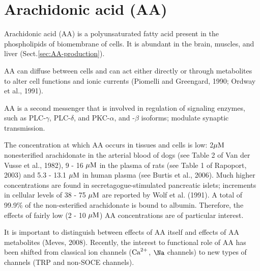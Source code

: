 \section{Arachidonic acid (AA)}
\label{sec:arachidonic-acids}

Arachidonic acid (AA) is a polyunsaturated fatty acid present in the
phospholipids of biomembrane of cells. It is abundant in the brain, muscles, and
liver (Sect.\ref{sec:AA-production}).

AA can diffuse between cells and can act either directly or through metabolites
to alter cell functions and ionic currents (Piomelli and Greengard, 1990; Ordway
et al., 1991).

AA is a second messenger that is involved in regulation of signaling enzymes,
such as PLC-$\gamma$, PLC-$\delta$, and PKC-$\alpha$, and -$\beta$
isoforms; modulate synaptic transmission. 

The concentration at which AA occurs in tissues and cells is low: 2${\mu\text{M}}$
nonesterified arachidonate in the arterial blood of dogs (see Table 2 of Van der
Vusse et al., 1982), 9 - 16 ${\mu\text{M}}$ in the plasma of rats (see Table 1 of Rapoport,
2003) and 5.3 - 13.1 ${\mu\text{M}}$ in human plasma (see Burtis et al., 2006).
Much higher concentrations are found in secretagogue-stimulated pancreatic
islets; increments in cellular levels of 38 - 75 ${\mu\text{M}}$ are reported by Wolf et
al. (1991). A total of 99.9\% of the non-esterified arachidonate is bound to
albumin. Therefore, the effects of fairly low (2 - 10 ${\mu\text{M}}$) AA concentrations are of
particular interest.

It is important to distinguish between effects of AA itself and effects of AA
metabolites (Meves, 2008). Recently, the interest to functional role of AA has
been shifted from classical ion channels (${\text{Ca}^{2+}}$, $\Na$ channels) to new types of
channels (TRP and non-SOCE channels).

